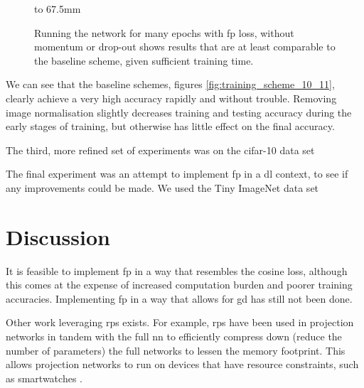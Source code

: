 \begin{figure}[p]
    \hbox to 67.5mm{}%
    \caption[The results of the twelfth training scheme]{Running the network for many epochs with \gls{fp} loss, without momentum or drop-out shows results that are at least comparable to the baseline scheme, given sufficient training time.}
    \label{fig:training_scheme_12}
\end{figure}

We can see that the baseline schemes, figures \ref{fig:training_scheme_10_11}, clearly achieve a very high accuracy rapidly and without trouble. Removing image normalisation slightly decreases training and testing accuracy during the early stages of training, but otherwise has little effect on the final accuracy.
\bigskip

The third, more refined set of experiments was on the \gls{cifar}-10 data set

The final experiment was an attempt to implement \gls{fp} in a \gls{dl} context, to see if any improvements could be made. We used the Tiny ImageNet data set

\section{Discussion}

It is feasible to implement \gls{fp} in a way that resembles the cosine loss, although this comes at the expense of increased computation burden and poorer training accuracies. Implementing \gls{fp} in a way that allows for \gls{gd} has still not been done.

Other work leveraging \gls{rp}s exists. For example, \gls{rp}s have been used in projection networks in tandem with the full \gls{nn} to efficiently compress down (reduce the number of parameters) the full networks to lessen the memory footprint. This allows projection networks to run on devices that have resource constraints, such as smartwatches \cite{projection_net}. 
\bigskip


